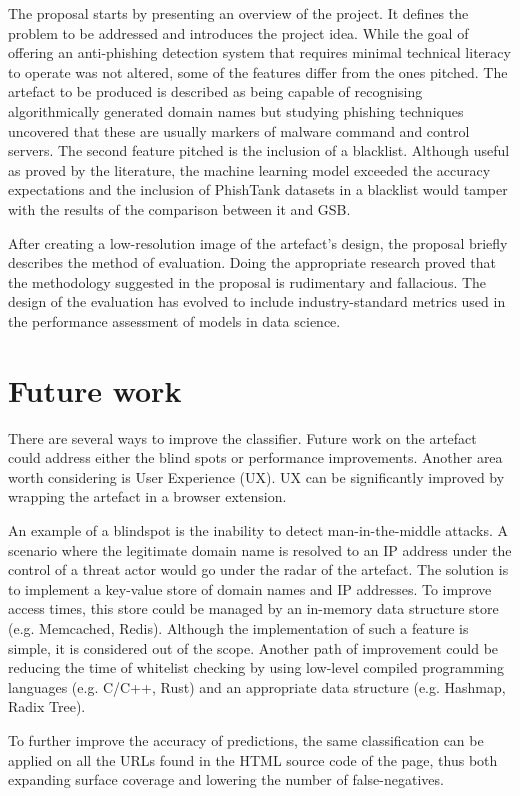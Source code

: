 The proposal starts by presenting an overview of the project. It defines the problem to be addressed and introduces the project idea. While the goal of offering an anti-phishing detection system that requires minimal technical literacy to operate was not altered, some of the features differ from the ones pitched. The artefact to be produced is described as being capable of recognising algorithmically generated domain names but studying phishing techniques uncovered that these are usually markers of malware command and control servers. The second feature pitched is the inclusion of a blacklist. Although useful as proved by the literature, the machine learning model exceeded the accuracy expectations and the inclusion of PhishTank datasets in a blacklist would tamper with the results of the comparison between it and GSB.

After creating a low-resolution image of the artefact's design, the proposal briefly describes the method of evaluation. Doing the appropriate research proved that the methodology suggested in the proposal is rudimentary and fallacious. The design of the evaluation has evolved to include industry-standard metrics used in the performance assessment of models in data science.

\section{Future work}
There are several ways to improve the classifier. Future work on the artefact could address either the blind spots or performance improvements. Another area worth considering is User Experience (UX). UX can be significantly improved by wrapping the artefact in a browser extension.

An example of a blindspot is the inability to detect man-in-the-middle attacks. A scenario where the legitimate domain name is resolved to an IP address under the control of a threat actor would go under the radar of the artefact. The solution is to implement a key-value store of domain names and IP addresses. To improve access times, this store could be managed by an in-memory data structure store (e.g. Memcached, Redis). Although the implementation of such a feature is simple, it is considered out of the scope.
Another path of improvement could be reducing the time of whitelist checking by using low-level compiled programming languages (e.g. C/C++, Rust) and an appropriate data structure (e.g. Hashmap, Radix Tree). 

To further improve the accuracy of predictions, the same classification can be applied on all the URLs found in the HTML source code of the page, thus both expanding surface coverage and lowering the number of false-negatives.

